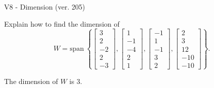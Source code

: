 \begin{exercise}
  \begin{exerciseTitle}V8 - Dimension (ver. 205)\end{exerciseTitle}
  \begin{exerciseStatement}
    Explain how to find the dimension of 
\[W=\mathrm{span}\ \left\{\left[\begin{array}{r}
3 \\
2 \\
-2 \\
2 \\
-3
\end{array}\right] , \left[\begin{array}{r}
1 \\
-1 \\
-4 \\
2 \\
1
\end{array}\right] , \left[\begin{array}{r}
-1 \\
1 \\
-1 \\
3 \\
2
\end{array}\right] , \left[\begin{array}{r}
2 \\
3 \\
12 \\
-10 \\
-10
\end{array}\right]\right\}.\]



  \end{exerciseStatement}
  \begin{exerciseAnswer}
   The dimension of \(W\) is  \(3\).
  


  \end{exerciseAnswer}
\end{exercise}
